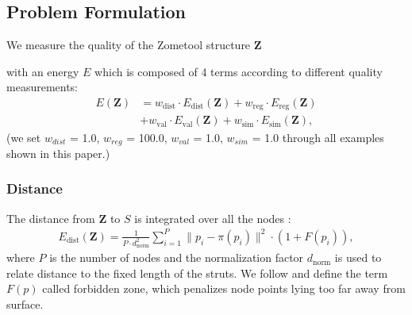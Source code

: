 
\subsection{Problem Formulation}
We measure the quality of the Zometool structure $\mathbf{Z}$ with an energy $E$ which is composed of 4 terms according to different quality measurements:
\begin{align}
\label{eq:sa_energy}
E(\mathbf{Z})&=w_{\text{dist}}\cdot E_{\text{dist}}(\mathbf{Z}) + w_{\text{reg}} \cdot E_{\text{reg}}(\mathbf{Z}) \nonumber \\ 
&+ w_{\text{val}}\cdot E_{\text{val}}(\mathbf{Z}) + 
w_{\text{sim}} \cdot E_{\text{sim}}(\mathbf{Z}),
\end{align}
(we set $w_{{dist}}$ = 1.0, $w_{{reg}}$ = 100.0, $w_{{val}}$ = 1.0, $w_{{sim}}$ = 1.0 through all examples shown in this paper.)

\subsubsection{Distance}
The distance from $\mathbf{Z}$ to $S$ is integrated over all the nodes :
\begin{align}
E_{\text{dist}}(\mathbf{Z}) = \frac{1}{P\cdot d^2_{\text{norm}}} \sum_{i=1}^{P} \|p_i - \pi(p_i) \|^2 \cdot (1+F(p_i)),
\end{align}
where $P$ is the number of nodes and the normalization factor $d_{\text{norm}}$ is used to relate distance to the fixed length of the struts.
We follow \cite{zimmer:2014:Zometool} and define the term $F(p)$ called forbidden zone, which penalizes node points lying too far away from  surface. 


